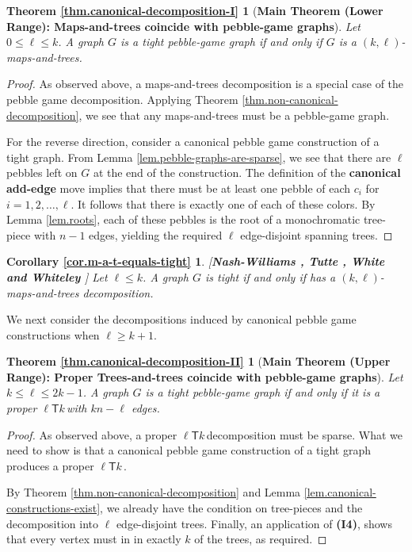 \documentclass[Svgc,nospthms]{Svgc}
\newcommand{\ellteekay}{\ensuremath{\ell{\mathsf T}k}\,}
\newcommand{\reflem}[1]{Lemma \ref{lem.#1}}
\newcommand{\refthm}[1]{Theorem \ref{thm.#1}}
\newcommand{\refcor}[1]{Corollary \ref{cor.#1}}
\newcommand{\restateenv}{ZZZ}
\newenvironment{restate}[1]{
  \renewcommand{\restateenv}{restate.#1}
  \newtheorem*{\restateenv}{\refthm{#1}}
  \begin{\restateenv}
}{\end{\restateenv}}
\newenvironment{restatecor}[1]{
  \renewcommand{\restateenv}{restate.#1}
  \newtheorem*{\restateenv}{\refcor{#1}}
  \begin{\restateenv}
}{\end{\restateenv}}
\begin{document}
	\begin{restate}{canonical-decomposition-I}[{\bf Main Theorem (Lower Range): Maps-and-trees coincide with pebble-game graphs}]
	Let $0\le \ell\le k$. A graph $G$ is a tight pebble-game graph if and only if $G$ is a $(k,\ell)$-maps-and-trees.
	\end{restate}
	\begin{proof}
		
		As observed above, a maps-and-trees decomposition is a special case of the pebble 
		game decomposition.  Applying \refthm{non-canonical-decomposition}, we see that
		any maps-and-trees must be a pebble-game graph.
		
		For the reverse direction, consider a canonical pebble game construction of a tight graph. 
		From \reflem{pebble-graphs-are-sparse}, we see that there are $\ell$ pebbles left on 
		$G$ at the end of the construction.
		The definition of the {\bf canonical add-edge} move 
		implies that there must be at least one pebble of 
		each $c_i$ for $i=1,2,\ldots,\ell$.  It follows that there is exactly one of each of these 
		colors.  By \reflem{roots}, each of these pebbles is the root of a monochromatic tree-piece
		with $n-1$ edges, yielding the required $\ell$ edge-disjoint spanning trees.
	 \end{proof}
	\begin{restatecor}{m-a-t-equals-tight}
		[\textbf{Nash-Williams \cite{nash-williams:decomposition-into-forests:1964}, Tutte \cite{tutte:decomposing-graph-in-factors-1961}, White and Whiteley \cite{whiteley:union-matroids}}] 
		Let $\ell\le k$. A graph $G$ is tight if and only if has a $(k,\ell)$-maps-and-trees decomposition.
	\end{restatecor}
	
	We next consider the decompositions induced by canonical pebble game 
	constructions when $\ell\ge k+1$. 
	\begin{restate}{canonical-decomposition-II}[{\bf Main Theorem (Upper Range): Proper Trees-and-trees coincide with pebble-game graphs}]
		Let $k\le \ell\le 2k-1$. A graph $G$ is a tight pebble-game graph if and only if it is a proper \ellteekay with $kn-\ell$ edges. 
	\end{restate}
	\begin{proof}
		As observed above, a proper \ellteekay decomposition must be sparse.  
		What we need to show is that a canonical pebble game construction of a tight 
		graph produces a proper \ellteekay.
		
		By \refthm{non-canonical-decomposition} and \reflem{canonical-constructions-exist}, 
		we already have the condition on tree-pieces and the decomposition into $\ell$ edge-disjoint
		trees.  Finally, an application of {\bf (I4)}, shows that every vertex must in in 
		exactly $k$ of the trees, as required.
	 \end{proof}
	
\end{document}
